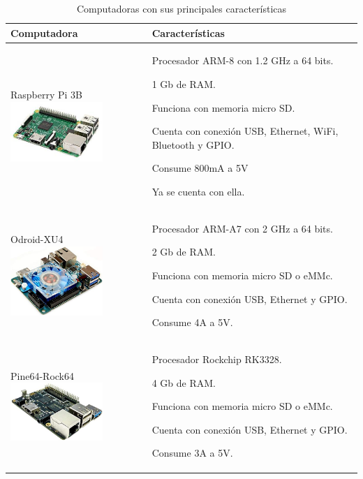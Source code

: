 \begin{table}[htbp!]
	\caption{Computadoras con sus principales características}
	\label{tab:computadoras}
	\begin{center}
		\begin{tabular}{|p{5cm}|p{7cm}|}
			\hline
			{\bf Computadora} & {\bf Características}\\
			\hline
			Raspberry Pi 3B \includegraphics[width=3.5cm]{./Figuras/RPi} &
			\begin{compactitem}
				\item Procesador ARM-8 con 1.2 GHz a 64 bits.
				\item 1 Gb de RAM.
				\item Funciona con memoria micro SD.
				\item Cuenta con conexión USB, Ethernet, WiFi, Bluetooth y GPIO.
				\item Consume 800mA a 5V
				\item Ya se cuenta con ella.
			\end{compactitem}\\
			\hline
			Odroid-XU4 \includegraphics[width=3.5cm]{./Figuras/Odroid} &
			\begin{compactitem}
				\item Procesador ARM-A7 con 2 GHz a 64 bits.
				\item 2 Gb de RAM.
				\item Funciona con memoria micro SD o eMMc.
				\item Cuenta con conexión USB, Ethernet y GPIO.
				\item Consume 4A a 5V.
			\end{compactitem}\\
			\hline
			Pine64-Rock64 \includegraphics[width=3.5cm]{./Figuras/Rock64} &
			\begin{compactitem}
				\item Procesador Rockchip RK3328.
				\item 4 Gb de RAM.
				\item Funciona con memoria micro SD o eMMc.
				\item Cuenta con conexión USB, Ethernet y GPIO.
				\item Consume 3A a 5V.
			\end{compactitem}\\
			\hline
		\end{tabular}
	\end{center}
\end{table}
